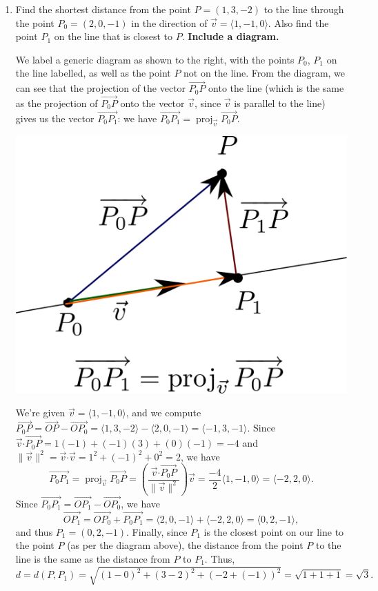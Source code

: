 \documentclass[12pt]{article}
\newcommand{\len}[1]{\lVert #1\rVert}
\newcommand{\dotp}{\boldsymbol{\cdot}}
\DeclareMathOperator{\proj}{proj}
\begin{document}
\begin{enumerate}
\newpage

\item Find the shortest distance from the point $P=(1,3,-2)$ to the line through the point $P_0 = (2,0,-1)$ in the direction of $\vec{v} = \langle 1, -1, 0\rangle$. Also find the point $P_1$ on the line that is closest to $P$. {\bf Include a diagram.}


\bigskip

\begin{multicols}{2}
 We label a generic diagram as shown to the right, with the points $P_0$, $P_1$ on the line labelled, as well as the point $P$ not on the line. From the diagram, we can see that the projection of the vector $\overrightarrow{P_0P}$ onto the line (which is the same as the projection of $\overrightarrow{P_0P}$ onto the vector $\vec{v}$, since $\vec{v}$ is parallel to the line) gives us the vector $\overrightarrow{P_0P_1}$: we have $\overrightarrow{P_0P_1} = \proj_{\vec{v}}\overrightarrow{P_0P}$.
\columnbreak

\begin{center}
 \includegraphics[width=0.7\columnwidth]{WS3-3}
\end{center}
\end{multicols}
We're given $\vec{v} = \langle 1,-1,0\rangle$, and we compute $\overrightarrow{P_0P}=\overrightarrow{OP}-\overrightarrow{OP_0} = \langle 1, 3, -2\rangle-\langle 2, 0, -1\rangle =\langle -1, 3, -1\rangle$. Since $\vec{v}\dotp \overrightarrow{P_0P} = 1(-1)+(-1)(3)+(0)(-1) = -4$ and $\len{\vec{v}}^2 = \vec{v}\dotp\vec{v} = 1^2+(-1)^2+0^2 = 2$, we have
\[
 \overrightarrow{P_0P_1} = \proj_{\vec{v}}\overrightarrow{P_0P} = \left(\frac{\vec{v}\dotp \overrightarrow{P_0P}}{\len{\vec{v}}^2}\right)\vec{v} = \frac{-4}{2}\langle 1, -1, 0\rangle = \langle -2, 2, 0\rangle.
\]
Since $\overrightarrow{P_0P_1} = \overrightarrow{OP_1}-\overrightarrow{OP_0}$, we have
\[
 \overrightarrow{OP_1} = \overrightarrow{OP_0}+\overrightarrow{P_0P_1} = \langle 2, 0, -1\rangle + \langle -2, 2, 0\rangle = \langle 0, 2, -1\rangle,
\]
and thus $P_1 = (0,2,-1)$. Finally, since $P_1$ is the closest point on our line to the point $P$ (as per the diagram above), the distance from the point $P$ to the line is the same as the distance from $P$ to $P_1$. Thus,
\[
 d = d(P,P_1) = \sqrt{(1-0)^2+(3-2)^2+(-2+(-1))^2} = \sqrt{1+1+1}=\sqrt{3}.
\]


\end{enumerate}
\end{document}

